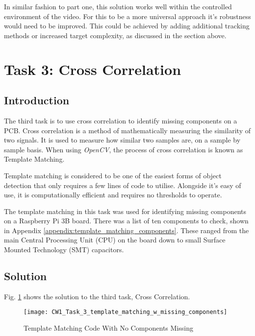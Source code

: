 \documentclass[conference]{IEEEtran}
\begin{document}
In similar fashion to part one, this solution works well within the controlled environment of the video. For this to be a more universal approach it's robustness would need to be improved. This could be achieved by adding additional tracking methods or increased target complexity, as discussed in the section above.  

\section{Task 3: Cross Correlation} 

\subsection{Introduction}

The third task is to use cross correlation to identify missing components on a PCB. Cross correlation is a method of mathematically measuring the similarity of two signals. It is used to measure how similar two samples are, on a sample by sample basis. \cite{ref:what_is_cross_corrilation} When using \textit{OpenCV}, the process of cross correlation is known as Template Matching. \cite{ref:open_cv_templae_matching}

Template matching is considered to be one of the easiest forms of object detection that only requires a few lines of code to utilise. Alongside it's easy of use, it is computationally efficient and requires no thresholds to operate. \cite{ref:open_cv_templae_matching}

The template matching in this task was used for identifying missing components on a Raspberry Pi 3B board. There was a list of ten components to check, shown in Appendix \ref{appendix:template_matching_components}. These ranged from the main Central Processing Unit (CPU) on the board down to small Surface Mounted Technology (SMT) capacitors. 

\subsection{Solution}
Fig. \ref{fig:CW1_Task_3_template_matching_w_missing_components} shows the solution to the third task, Cross Correlation.

\begin{figure}[h]
\centerline{\texttt{[image: CW1\_Task\_3\_template\_matching\_w\_missing\_components]}}
\caption{Template Matching Code With No Components Missing}
\label{fig:CW1_Task_3_template_matching_w_missing_components}
\end{figure}
\end{document}
